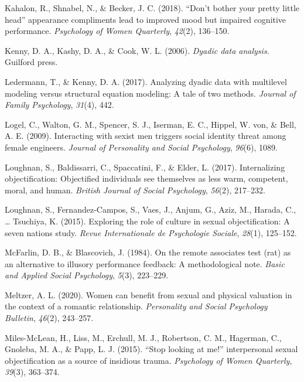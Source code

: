 \documentclass[man]{apa6}
\begin{document}
\hypertarget{ref-kahalon2018don}{}
Kahalon, R., Shnabel, N., \& Becker, J. C. (2018). ``Don't bother your
pretty little head'' appearance compliments lead to improved mood but
impaired cognitive performance. \emph{Psychology of Women Quarterly},
\emph{42}(2), 136--150.

\hypertarget{ref-kenny2006dyadic}{}
Kenny, D. A., Kashy, D. A., \& Cook, W. L. (2006). \emph{Dyadic data
analysis}. Guilford press.

\hypertarget{ref-ledermann2017analyzing}{}
Ledermann, T., \& Kenny, D. A. (2017). Analyzing dyadic data with
multilevel modeling versus structural equation modeling: A tale of two
methods. \emph{Journal of Family Psychology}, \emph{31}(4), 442.

\hypertarget{ref-logel2009interacting}{}
Logel, C., Walton, G. M., Spencer, S. J., Iserman, E. C., Hippel, W.
von, \& Bell, A. E. (2009). Interacting with sexist men triggers social
identity threat among female engineers. \emph{Journal of Personality and
Social Psychology}, \emph{96}(6), 1089.

\hypertarget{ref-loughnan2017internalizing}{}
Loughnan, S., Baldissarri, C., Spaccatini, F., \& Elder, L. (2017).
Internalizing objectification: Objectified individuals see themselves as
less warm, competent, moral, and human. \emph{British Journal of Social
Psychology}, \emph{56}(2), 217--232.

\hypertarget{ref-loughnan2015exploring}{}
Loughnan, S., Fernandez-Campos, S., Vaes, J., Anjum, G., Aziz, M.,
Harada, C., \ldots{} Tsuchiya, K. (2015). Exploring the role of culture
in sexual objectification: A seven nations study. \emph{Revue
Internationale de Psychologie Sociale}, \emph{28}(1), 125--152.

\hypertarget{ref-mcfarlin1984remote}{}
McFarlin, D. B., \& Blascovich, J. (1984). On the remote associates test
(rat) as an alternative to illusory performance feedback: A
methodological note. \emph{Basic and Applied Social Psychology},
\emph{5}(3), 223--229.

\hypertarget{ref-meltzer2020women}{}
Meltzer, A. L. (2020). Women can benefit from sexual and physical
valuation in the context of a romantic relationship. \emph{Personality
and Social Psychology Bulletin}, \emph{46}(2), 243--257.

\hypertarget{ref-miles2015stop}{}
Miles-McLean, H., Liss, M., Erchull, M. J., Robertson, C. M., Hagerman,
C., Gnoleba, M. A., \& Papp, L. J. (2015). ``Stop looking at me!''
interpersonal sexual objectification as a source of insidious trauma.
\emph{Psychology of Women Quarterly}, \emph{39}(3), 363--374.
\end{document}
